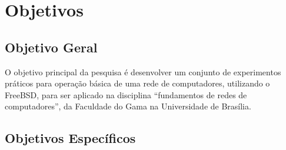 \section{Objetivos}

    \subsection{Objetivo Geral}
    
    O objetivo principal da pesquisa é desenvolver um conjunto de experimentos práticos para operação básica de uma rede de computadores, utilizando o FreeBSD, para ser aplicado na disciplina “fundamentos de redes de computadores”, da Faculdade do Gama na Universidade de Brasília.
    
    \subsection{Objetivos Específicos}
    
